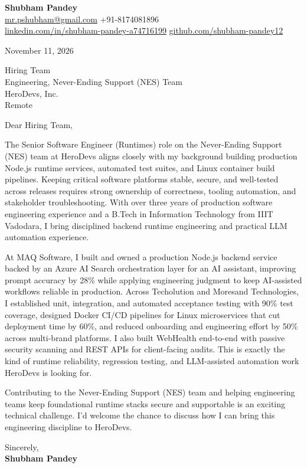 \documentclass[a4paper,11pt]{article}
\begin{document}
\textbf{\Large Shubham Pandey}\\
\href{mailto:mr.pshubham@gmail.com}{mr.pshubham@gmail.com} \quad +91-8174081896\\
\href{https://www.linkedin.com/in/shubham-pandey-a74716199/}{linkedin.com/in/shubham-pandey-a74716199} \quad
\href{https://github.com/shubham-pandey12}{github.com/shubham-pandey12}

\vspace{1em}
November 11, 2026

\vspace{1em}
Hiring Team\\
Engineering, Never-Ending Support (NES) Team\\
HeroDevs, Inc.\\
Remote

\vspace{1em}
Dear Hiring Team,

The Senior Software Engineer (Runtimes) role on the Never-Ending Support (NES) team at HeroDevs aligns closely with my background building production Node.js runtime services, automated test suites, and Linux container build pipelines. Keeping critical software platforms stable, secure, and well-tested across releases requires strong ownership of correctness, tooling automation, and stakeholder troubleshooting. With over three years of production software engineering experience and a B.Tech in Information Technology from IIIT Vadodara, I bring disciplined backend runtime engineering and practical LLM automation experience.

At MAQ Software, I built and owned a production Node.js backend service backed by an Azure AI Search orchestration layer for an AI assistant, improving prompt accuracy by 28\% while applying engineering judgment to keep AI-assisted workflows reliable in production. Across Techolution and Moresand Technologies, I established unit, integration, and automated acceptance testing with 90\% test coverage, designed Docker CI/CD pipelines for Linux microservices that cut deployment time by 60\%, and reduced onboarding and engineering effort by 50\% across multi-brand platforms. I also built WebHealth end-to-end with passive security scanning and REST APIs for client-facing audits. This is exactly the kind of runtime reliability, regression testing, and LLM-assisted automation work HeroDevs is looking for.

Contributing to the Never-Ending Support (NES) team and helping engineering teams keep foundational runtime stacks secure and supportable is an exciting technical challenge. I'd welcome the chance to discuss how I can bring this engineering discipline to HeroDevs.

\vspace{1em}
Sincerely,\\[0.5em]
\textbf{Shubham Pandey}
\end{document}
